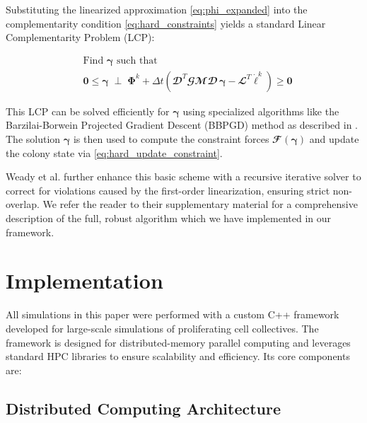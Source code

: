 \documentclass[conference]{IEEEtran}
\begin{document}
Substituting the linearized approximation \autoref{eq:phi_expanded} into the complementarity condition \autoref{eq:hard_constraints} yields a standard Linear Complementarity Problem (LCP):

\begin{equation}  \label{eq:final_lcp}
    \begin{aligned}
         & \text{Find } \boldsymbol{\gamma} \text{ such that} \\
         & \mathbf{0} \leq \boldsymbol{\gamma}
        \;\perp\;
        \mathbf{\Phi}^k
        + \Delta t \left( \mathbfcal{D}^T \mathbfcal{G} \mathbfcal{M} \mathbfcal{D}\,\boldsymbol{\gamma}
        - \mathbfcal{L}^T \dot{\boldsymbol{\ell}}^k \right)
        \geq \mathbf{0}
    \end{aligned}
\end{equation}

This LCP can be solved efficiently for $\boldsymbol{\gamma}$ using specialized algorithms like the Barzilai-Borwein Projected Gradient Descent (BBPGD) method as described in \cite{Weady2024}. The solution $\boldsymbol{\gamma}$ is then used to compute the constraint forces $\mathbfcal{F}(\boldsymbol{\gamma})$ and update the colony state via \autoref{eq:hard_update_constraint}.


Weady et al. \cite{Weady2024} further enhance this basic scheme with a recursive iterative solver to correct for violations caused by the first-order linearization, ensuring strict non-overlap. We refer the reader to their supplementary material for a comprehensive description of the full, robust algorithm which we have implemented in our framework.

\newpage

\section{Implementation}

All simulations in this paper were performed with a custom C++ framework developed for large-scale simulations of proliferating cell collectives. The framework is designed for distributed-memory parallel computing and leverages standard HPC libraries to ensure scalability and efficiency. Its core components are:

\subsection{Distributed Computing Architecture}
\end{document}
